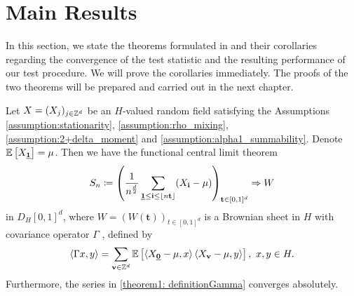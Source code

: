 \section{Main Results}

In this section, we state the theorems formulated in \cite{[0]BUCCHIA2017344} and their corollaries regarding the convergence of the test statistic and the resulting performance of our test procedure. We will prove the corollaries immediately. The proofs of the two theorems will be prepared and carried out in the next chapter.

\begin{thm}[FCLT] \label{theorem1}
    Let $X = (X_j)_{j \in \mathbb{Z}^d}$ be an $H$-valued random field satisfying the Assumptions \ref{assumption:stationarity}, \ref{assumption:rho_mixing}, \ref{assumption:2+delta_moment} and \ref{assumption:alpha1_summability}. Denote $\EE{X_{\usbf[1]}} = \mu$.
    Then we have the functional central limit theorem
    \[
        S_n \coloneqq \left( \frac{1}{n^{\frac{d}{2}}} \sum\limits_{\usbf[1] \leq \mathbf{i} \leq \floor*{n \mathbf{t}}} (X_{\mathbf{i}} - \mu) \right)_{\mathbf{t} \in [0, 1]^d} \Rightarrow W
    \]
    in $D_H[0, 1]^d$, where $W = (W(\mathbf{t}))_{t \in [0, 1]^d}$ is a Brownian sheet in $H$ with covariance operator $\Gamma$%
    , defined by
    \begin{equation} \label{theorem1: definitionGamma}
        \left\langle \Gamma x, y \right\rangle
        = \sum\limits_{\mathbf{v} \in \ZZ^d}
            \EE{ \langle X_{\usbf[0]} - \mu, x \rangle \left\langle X_{\mathbf{v}} - \mu, y \right\rangle}
        , \ x, y \in H. 
    \end{equation}
    Furthermore, the series in \eqref{theorem1: definitionGamma} converges absolutely.
\end{thm}

